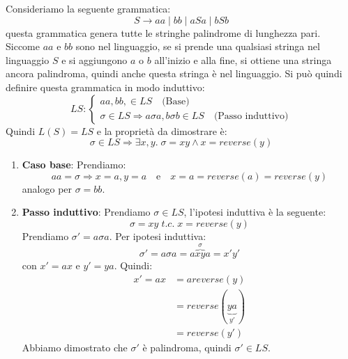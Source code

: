 \documentclass[a4paper]{article}
\begin{document}
\begin{example}
  Consideriamo la seguente grammatica:
  \[
    S \to aa \mid bb \mid aSa \mid bSb
  \] 
  questa grammatica genera tutte le stringhe palindrome di lunghezza pari.
  Siccome \( aa \) e \( bb \) sono nel linguaggio, se si prende una qualsiasi
  stringa nel linguaggio \( S \) e si aggiungono \( a \) o \( b \) all'inizio e
  alla fine, si ottiene una stringa ancora palindroma, quindi anche questa stringa è
  nel linguaggio. Si può quindi definire questa grammatica in modo induttivo:
  \[
    LS: 
    \begin{cases}
      aa, bb, \in LS \quad \text{(Base)} \\
      \sigma \in LS \Rightarrow a\sigma a, b\sigma b \in LS \quad \text{(Passo induttivo)}
    \end{cases}
  \] 
  Quindi \( L(S) = LS \) e la proprietà da dimostrare è:
  \[
    \sigma \in LS \Rightarrow \exists x, y.\; \sigma = x y \land x = reverse(y)
  \] 

  \begin{enumerate}
    \item \textbf{Caso base}: Prendiamo:
      \[
        aa = \sigma \Rightarrow x = a, y = a \quad \text{e} \quad
        x = a = reverse(a) = reverse(y)
      \] 
      analogo per \( \sigma = bb \).

    \item \textbf{Passo induttivo}: Prendiamo \( \sigma \in LS \), l'ipotesi
      induttiva è la seguente:
      \[
        \sigma = xy \;t.c.\; x = reverse(y)
      \] 
      Prendiamo \( \sigma' = a \sigma a \). Per ipotesi induttiva:
      \[
        \sigma' = a \sigma a = a \overbrace{xy}^{\sigma} a = x'y'
      \] 
      con \( x' = ax \) e \( y' = ya \). Quindi:
      \[
        \begin{aligned}
          x' = ax &= a reverse(y) \\
                  &= reverse(\underbrace{ya}_{y'}) \\
                  &= reverse(y')
        \end{aligned}
      \] 
      Abbiamo dimostrato che \( \sigma' \) è palindroma, quindi \( \sigma' \in LS \).
  \end{enumerate}
\end{example}
\end{document}
